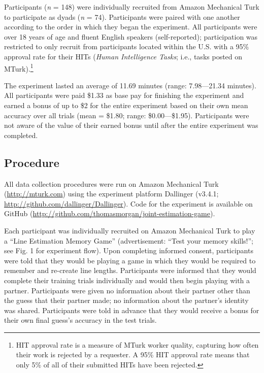 \documentclass[10pt, letterpaper]{article}
\begin{document}
Participants (\emph{n} = 148) were individually recruited from Amazon
Mechanical Turk to participate as dyads (\emph{n} = 74). Participants
were paired with one another according to the order in which they began
the experiment. All participants were over 18 years of age and fluent
English speakers (self-reported); participation was restricted to only
recruit from participants located within the U.S. with a 95\% approval
rate for their HITs (\emph{Human Intelligence Tasks}; i.e., tasks posted
on
MTurk).\footnote{HIT approval rate is a measure of MTurk worker quality, capturing how often their work is rejected by a requester. A 95\% HIT approval rate means that only 5\% of all of their submitted HITs have been rejected.}

The experiment lasted an average of 11.69 minutes (range: 7.98---21.34
minutes). All participants were paid \$1.33 as base pay for finishing
the experiment and earned a bonus of up to \$2 for the entire experiment
based on their own mean accuracy over all trials (mean = \$1.80; range:
\$0.00---\$1.95). Participants were not aware of the value of their
earned bonus until after the entire experiment was completed.

\subsection{Procedure}\label{procedure}

All data collection procedures were run on Amazon Mechanical Turk
(\url{http://mturk.com}) using the experiment platform Dallinger
(v3.4.1; \url{http://github.com/dallinger/Dallinger}). Code for the
experiment is available on GitHub
(\url{http://github.com/thomasmorgan/joint-estimation-game}).

Each participant was individually recruited on Amazon Mechanical Turk to
play a ``Line Estimation Memory Game'' (advertisement: ``Test your
memory skills!''; see Fig. 1 for experiment flow). Upon completing
informed consent, participants were told that they would be playing a
game in which they would be required to remember and re-create line
lengths. Participants were informed that they would complete their
training trials individually and would then begin playing with a
partner. Participants were given no information about their partner
other than the guess that their partner made; no information about the
partner's identity was shared. Participants were told in advance that
they would receive a bonus for their own final guess's accuracy in the
test trials.
\end{document}
